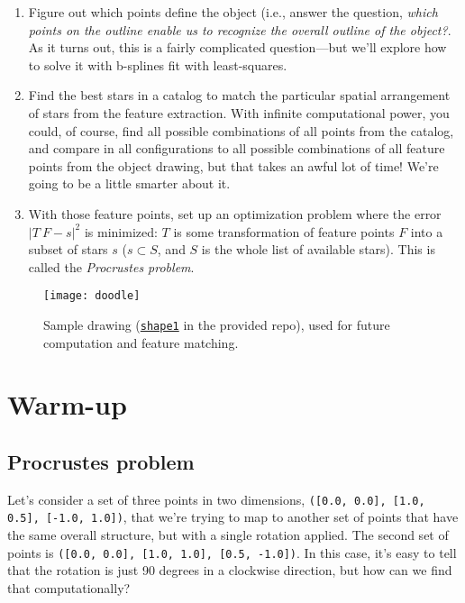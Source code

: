 \documentclass{article}
\begin{document}
\begin{enumerate}
\item Figure out which points define the object (i.e., answer the question, \textit{which points on the outline enable us to recognize the overall outline of the object?}. As it turns out, this is a fairly complicated question---but we'll explore how to solve it with b-splines fit with least-squares.

\item Find the best stars in a catalog to match the particular spatial arrangement of stars from the feature extraction. With infinite computational power, you could, of course, find all possible combinations of all points from the catalog, and compare in all configurations to all possible combinations of all feature points from the object drawing, but that takes an awful lot of time! We're going to be a little smarter about it.

\item With those feature points, set up an optimization problem where the error $|T~F - s|^2$ is minimized: $T$ is some transformation of feature points $F$ into a subset of stars $s$ ($s \subset S$, and $S$ is the whole list of available stars). This is called the \textit{Procrustes problem}.
\end{enumerate}

\begin{figure}[!h]
\centering
\texttt{[image: doodle]}
\caption{Sample drawing (\texttt{\href{https://github.com/jvahala/Space-Doodles/blob/master/doodleverse_main/shape1.png}{shape1}} in the provided repo), used for future computation and feature matching.}
\label{fig:doodle}
\end{figure}

\section{Warm-up}

\subsection{Procrustes problem}

Let's consider a set of three points in two dimensions, \texttt{([0.0, 0.0], [1.0, 0.5], [-1.0, 1.0])}, that we're trying to map to another set of points that have the same overall structure, but with a single rotation applied. The second set of points is \texttt{([0.0, 0.0], [1.0, 1.0], [0.5, -1.0])}. In this case, it's easy to tell that the rotation is just 90 degrees in a clockwise direction, but how can we find that computationally?
\end{document}

